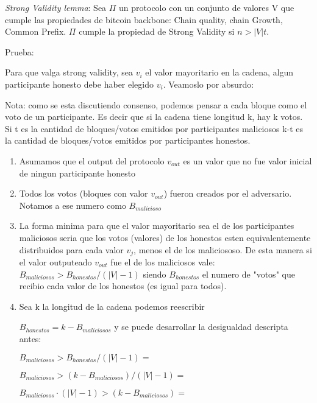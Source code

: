\documentclass[12pt,addpoints,answers]{exam}
\begin{document}
\begin{questions}
\begin{parts}
    \begin{solution} %
        \textit{Strong Validity lemma}: Sea $\Pi$ un protocolo con un conjunto de valores V que cumple las propiedades de
        bitcoin backbone: Chain quality, chain Growth, Common Prefix. $\Pi$ cumple la propiedad de Strong Validity 
         si $n > |V| t$.
        
        Prueba:

        Para que valga strong validity, sea $v_i$ el valor mayoritario en la cadena, algun participante honesto debe 
        haber elegido $v_i$. Veamoslo por absurdo:

        Nota: como se esta discutiendo consenso, podemos pensar a cada bloque como el voto de un participante. Es decir
        que si la cadena tiene longitud k, hay k votos. Si t es la cantidad de bloques/votos emitidos por participantes maliciosos
        k-t es la cantidad de bloques/votos emitidos por participantes honestos.

        \begin{enumerate}
            \item{Asumamos que el output del protocolo $v_{out}$ es un valor que no fue valor inicial de ningun participante honesto}
            \item{Todos los votos (bloques con valor $v_{out}$) fueron creados por el adversario. Notamos a ese numero como $B_{malicioso}$}
            \item {La forma minima para que el valor mayoritario sea el de los participantes maliciosos seria que los votos (valores) de
            los honestos esten equivalentemente distribuidos para cada valor $v_j$, menos el de los maliciososo. 
            De esta manera si el valor outputeado $v_{out}$ fue el de los maliciosos vale: 
            $B_{maliciosos} > B_{honestos} / (|V| - 1)$} siendo $B_{honestos}$ el numero de "votos" que recibio cada valor de los honestos
            (es igual para todos).
            \item{Sea k la longitud de la cadena podemos reescribir 
            
            $B_{honestos} = k - B_{maliciosos}$ y se puede desarrollar la desigualdad descripta antes:

            $B_{maliciosos} > B_{honestos} / (|V| - 1) = $
            
            $B_{maliciosos} > (k - B_{maliciosos}) / (|V| - 1) = $

            $B_{maliciosos} \cdot (|V| - 1) > (k - B_{maliciosos}) = $

}
\end{enumerate}
\end{solution}
\end{parts}
\end{questions}
\end{document}
